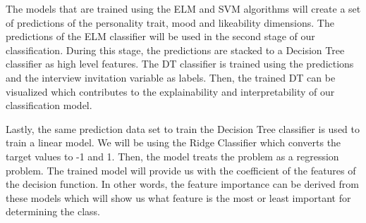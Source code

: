 The models that are trained using the ELM and SVM algorithms will create a set of predictions of the personality trait, mood and likeability dimensions. The predictions of the ELM classifier will be used in the second stage of our classification. During this stage, the predictions are stacked to a Decision Tree classifier as high level features. The DT classifier is trained using the predictions and the interview invitation variable as labels. Then, the trained DT can be visualized which contributes to the explainability and interpretability of our classification model.

Lastly, the same prediction data set to train the Decision Tree classifier is used to train a linear model. We will be using the Ridge Classifier which converts the target values to -1 and 1. Then, the model treats the problem as a regression problem. The trained model will provide us with the coefficient of the features of the decision function. In other words, the feature importance can be derived from these models which will show us what feature is the most or least important for determining the class.


